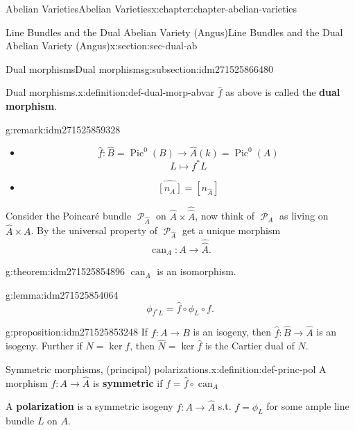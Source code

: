 \documentclass[oneside,10pt,]{book}
\newcommand{\terminology}[1]{\textbf{#1}}
\numberwithin{equation}{section}
\newcommand{\sheaf}[1]{\operatorname{\mathcal{#1}}}
\newcommand{\lb}{[}
\newcommand{\rb}{]}
\DeclareMathOperator{\Pic}{Pic}
\begin{document}
\begin{chapterptx}{Abelian Varieties}{}{Abelian Varieties}{}{}{x:chapter:chapter-abelian-varieties}
\begin{sectionptx}{Line Bundles and the Dual Abelian Variety (Angus)}{}{Line Bundles and the Dual Abelian Variety (Angus)}{}{}{x:section:sec-dual-ab}
\begin{subsectionptx}{Dual morphisms}{}{Dual morphisms}{}{}{g:subsection:idm271525866480}
%
\begin{definition}{Dual morphisms.}{x:definition:def-dual-morp-abvar}%
\(\hat f\) as above is called the \terminology{dual morphism}.%
\end{definition}
\begin{remark}{}{g:remark:idm271525859328}%
%
\begin{itemize}[label=\textbullet]
\item{}%
\begin{equation*}
\hat f\colon \hat B = \Pic^0(B) \to \hat A(k) = \Pic^0(A)
\end{equation*}
%
\begin{equation*}
L\mapsto f^*L
\end{equation*}
%
\item{}%
\begin{equation*}
\hat{\lb n_A\rb} = [n_{\hat A}]
\end{equation*}
%
\end{itemize}
%
\end{remark}
Consider the Poincaré bundle \(\sheaf P_{\hat A}\) on \(\hat A \times \hat{\hat{A}}\), now think of \(\sheaf P_A\) as living on \(\hat A \times A\). By the universal property of \(\sheaf P_{\hat A}\) get a unique morphism%
\begin{equation*}
\operatorname{can}_A\colon A\to\hat{\hat A}\text{.}
\end{equation*}
%
\begin{theorem}{}{}{g:theorem:idm271525854896}%
\(\operatorname{can}_A\) is an isomorphism.%
\end{theorem}
\begin{lemma}{}{}{g:lemma:idm271525854064}%
%
\begin{equation*}
\phi_{f^*L} = \hat f\circ \phi_L\circ f\text{.}
\end{equation*}
%
\end{lemma}
\begin{proposition}{}{}{g:proposition:idm271525853248}%
If \(f\colon A \to B\) is an isogeny, then \(\hat f\colon \hat B \to \hat A\) is an isogeny. Further if \(N  = \ker f\), then \(\hat N = \ker \hat f\) is the Cartier  dual of \(N\).%
\end{proposition}
\begin{definition}{Symmetric morphisms, (principal) polarizations.}{x:definition:def-princ-pol}%
A morphism \(f\colon A \to \hat A\) is \terminology{symmetric} if \(f = \hat f\circ \operatorname{can}_A\)%
\par
A \terminology{polarization} is a symmetric isogeny \(f\colon A \to \hat A\) s.t. \(f=  \phi_L\) for some ample line bundle \(L\) on \(A\).%

\end{definition}
\end{subsectionptx}
\end{sectionptx}
\end{chapterptx}
\end{document}
